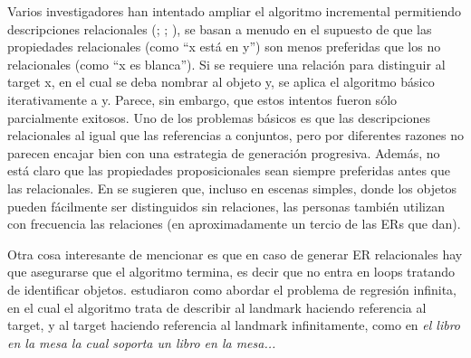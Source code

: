 Varios investigadores han intentado ampliar el algoritmo incremental permitiendo descripciones relacionales
(\cite{Horacek1997}; \cite{krahmer}; \cite{kelleher06:increm}), se basan a menudo
en el supuesto de que las propiedades relacionales (como ``x est\'a en y'') son menos preferidas que
los no relacionales (como ``x es blanca''). Si se requiere una relaci\'on para distinguir al target
x, en el cual se deba nombrar al objeto y, se aplica el algoritmo b\'asico iterativamente a y. Parece, sin embargo, que estos intentos
fueron s\'olo parcialmente exitosos. Uno de los problemas b\'asicos es que las descripciones relacionales
al igual que las referencias a conjuntos, pero por diferentes razones no parecen encajar bien con una
estrategia de generaci\'on progresiva. Adem\'as, no est\'a claro que las propiedades proposicionales sean siempre preferidas antes que las relacionales. En \cite{viet:gene11} se sugieren que, incluso en escenas simples, donde los objetos pueden f\'acilmente ser distinguidos
sin relaciones, las personas tambi\'en utilizan con frecuencia las relaciones (en aproximadamente un tercio de las ERs que dan).

Otra cosa interesante de mencionar es que en caso de generar ER relacionales hay que asegurarse que el algoritmo termina, es decir que no entra en loops tratando de identificar objetos. \cite{haddock} estudiaron como abordar el problema de regresi\'on infinita, en el cual el algoritmo trata de describir al landmark haciendo referencia al target, y al target haciendo referencia al landmark infinitamente, como en {\it el libro en la mesa la cual soporta un libro en la mesa... }



